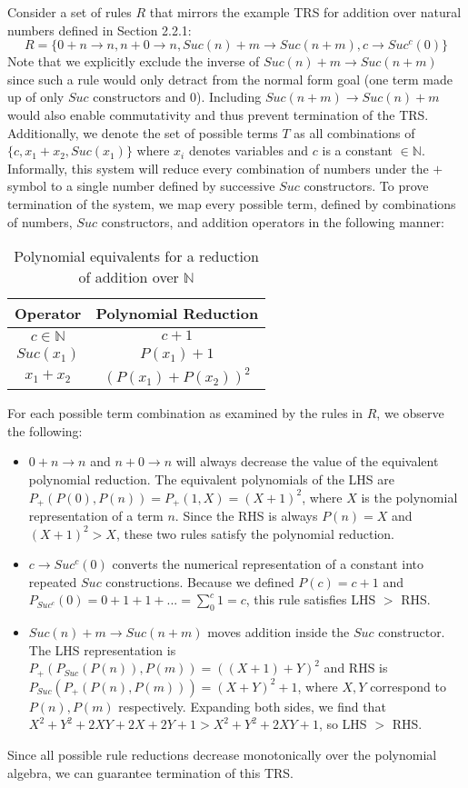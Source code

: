 \documentclass{article}
\begin{document}
Consider a set of rules $R$ that mirrors the example TRS for addition over natural numbers defined in Section 2.2.1:
\[R = \{0 + n \rightarrow n, n + 0 \rightarrow n, Suc(n) + m \rightarrow Suc(n+m), c \rightarrow Suc^c(0)\}\]
Note that we explicitly exclude the inverse of $Suc(n) + m \rightarrow Suc(n+m)$
since such a rule would only detract from the normal form goal (one term made up of only $Suc$ constructors and 0).
Including $Suc(n+m) \rightarrow Suc(n)+m$ would also enable commutativity and thus prevent termination of the TRS.
Additionally, we denote the set of possible terms $T$ as all combinations of $\{c, x_1 + x_2, Suc(x_1)\}$ where $x_i$ denotes variables and $c$ is a constant $\in \mathbb{N}$.
Informally, this system will reduce every combination of numbers under the $+$ symbol to a single number defined by successive $Suc$ constructors.
To prove termination of the system, we map every possible term, defined by combinations of numbers, $Suc$ constructors, and addition operators
in the following manner:
\begin{table}[H]
    \centering\begin{tabular}{|c|c|}
        \hline
        Operator & Polynomial Reduction\\
        \hline
        $c \in \mathbb{N}$ & $c + 1$\\
        $Suc(x_1)$ & $P(x_1) + 1$\\
        $x_1 + x_2$ & $(P(x_1) + P(x_2))^2$\\
        \hline
    \end{tabular}
    \caption{Polynomial equivalents for a reduction of addition over $\mathbb{N}$}
    \label{<label>}
\end{table}
For each possible term combination as examined by the rules in $R$, we observe the following:
\begin{itemize}
    \item $0 + n \rightarrow n$ and $n + 0 \rightarrow n$ will always decrease the value of the equivalent polynomial reduction.
    The equivalent polynomials of the LHS are $P_+(P(0),P(n)) = P_+(1, X) = (X+1)^2$, where $X$ is the polynomial representation of a term $n$.
    Since the RHS is always $P(n) = X$ and $(X+1)^2 > X$, these two rules satisfy the polynomial reduction.
    \item $c \rightarrow Suc^c(0)$ converts the numerical representation of a constant into repeated $Suc$ constructions.
    Because we defined $P(c) = c+1$ and $P_{Suc^c}(0) = 0 + 1 + 1 + ... = \sum_0^c 1 = c$, this rule satisfies LHS $>$ RHS.
    \item $Suc(n) + m \rightarrow Suc(n+m)$ moves addition inside the $Suc$ constructor. The LHS representation is $P_+(P_{Suc}(P(n)),P(m))=((X+1)+Y)^2$
    and RHS is $P_{Suc}(P_+(P(n),P(m)))=(X+Y)^2+1$, where $X,Y$ correspond to $P(n), P(m)$ respectively.
    Expanding both sides, we find that $X^2+Y^2+2XY+2X+2Y+1 > X^2+Y^2+2XY+1$, so LHS $>$ RHS.
\end{itemize}
Since all possible rule reductions decrease monotonically over the polynomial algebra, we can guarantee termination of this TRS.
\end{document}
